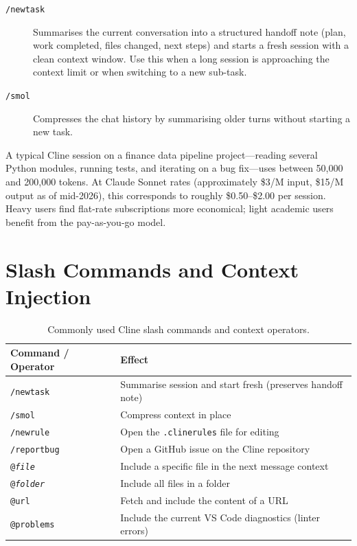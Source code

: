 \begin{description}
  \item[\texttt{/newtask}] Summarises the current conversation into a structured
        handoff note (plan, work completed, files changed, next steps) and starts
        a fresh session with a clean context window.  Use this when a long session
        is approaching the context limit or when switching to a new sub-task.

  \item[\texttt{/smol}] Compresses the chat history by summarising older turns
        without starting a new task.
\end{description}

\begin{remark}
\label{rem:cline-costs}
A typical Cline session on a finance data pipeline project---reading several
Python modules, running tests, and iterating on a bug fix---uses between
50{,}000 and 200{,}000 tokens.  At Claude Sonnet rates (approximately \$3/M
input, \$15/M output as of mid-2026), this corresponds to roughly \$0.50--\$2.00
per session.  Heavy users find flat-rate subscriptions more economical; light
academic users benefit from the pay-as-you-go model.
\end{remark}

\section{Slash Commands and Context Injection}
\label{app:cline:commands}

\begin{table}[ht]
\centering
\caption{Commonly used Cline slash commands and context operators.}
\label{tab:cline-commands}
\begin{tabular}{ll}
\toprule
\textbf{Command / Operator} & \textbf{Effect} \\
\midrule
\texttt{/newtask}    & Summarise session and start fresh (preserves handoff note) \\
\texttt{/smol}       & Compress context in place \\
\texttt{/newrule}    & Open the \texttt{.clinerules} file for editing \\
\texttt{/reportbug}  & Open a GitHub issue on the Cline repository \\
\texttt{@\textit{file}} & Include a specific file in the next message context \\
\texttt{@\textit{folder}} & Include all files in a folder \\
\texttt{@url}        & Fetch and include the content of a URL \\
\texttt{@problems}   & Include the current VS Code diagnostics (linter errors) \\
\bottomrule
\end{tabular}
\end{table}

